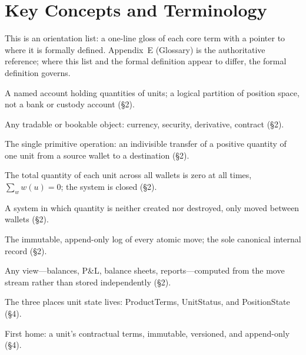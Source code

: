 \section*{Key Concepts and Terminology}

This is an orientation list: a one-line gloss of each core term with a pointer to where it
is formally defined. Appendix~E (Glossary) is the authoritative reference; where this list
and the formal definition appear to differ, the formal definition governs.

\begin{description}[style=nextline,leftmargin=1.5em,itemsep=3pt]

\item[\textbf{Wallet}] A named account holding quantities of units; a logical partition of
position space, not a bank or custody account (\S2).

\item[\textbf{Unit}] Any tradable or bookable object: currency, security, derivative,
contract (\S2).

\item[\textbf{Atomic move}] The single primitive operation: an indivisible transfer of a
positive quantity of one unit from a source wallet to a destination (\S2).

\item[\textbf{Conservation law}] The total quantity of each unit across all wallets is zero
at all times, $\sum_w w(u)=0$; the system is closed (\S2).

\item[\textbf{Closed system}] A system in which quantity is neither created nor destroyed,
only moved between wallets (\S2).

\item[\textbf{Event log / move stream}] The immutable, append-only log of every atomic
move; the sole canonical internal record (\S2).

\item[\textbf{Projection}] Any view---balances, P\&L, balance sheets, reports---computed
from the move stream rather than stored independently (\S2).

\item[\textbf{The three homes}] The three places unit state lives: ProductTerms,
UnitStatus, and PositionState (\S4).

\item[\textbf{ProductTerms}] First home: a unit's contractual terms, immutable, versioned,
and append-only (\S4).


\end{description}
